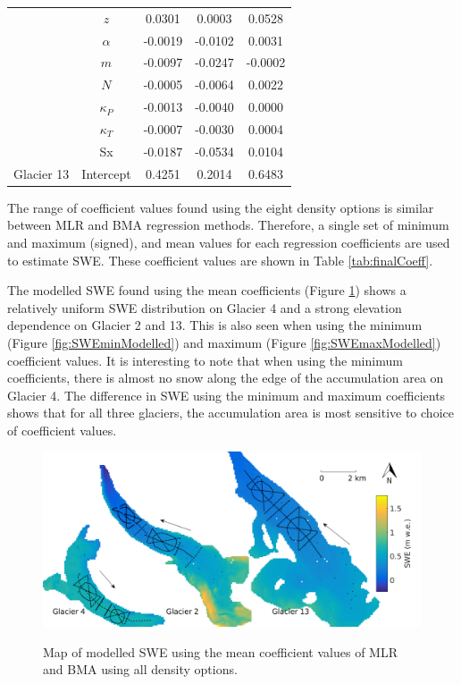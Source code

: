 \documentclass[12pt]{article}
\begin{document}
\begin{table}
\begin{tabular}{ccccc}
 & $z$ & 0.0301 & 0.0003 & 0.0528 \\
 
 & $\alpha$ & -0.0019 & -0.0102 & 0.0031 \\
 
 & $m$ & -0.0097 & -0.0247 & -0.0002 \\
 
 & $N$ & -0.0005 & -0.0064 & 0.0022 \\
 
 & $\kappa_P$ & -0.0013 & -0.0040 & 0.0000 \\
 
 & $\kappa_T$ & -0.0007 & -0.0030 & 0.0004 \\
 
 & Sx & -0.0187 & -0.0534 & 0.0104 \\
 
\multirow{-9}{*}{Glacier 13} & Intercept & 0.4251 & 0.2014 & 0.6483
\end{tabular}
\end{table}	

The range of coefficient values found using the eight density options is similar between MLR and BMA regression methods. Therefore, a single set of minimum and maximum (signed), and mean values for each regression coefficients are used to estimate SWE. These coefficient values are shown in Table \ref{tab:finalCoeff}. 

The modelled SWE found using the mean coefficients (Figure \ref{fig:SWEmeanModelled}) shows a relatively uniform SWE distribution on Glacier 4 and a strong elevation dependence on Glacier 2 and 13. This is also seen when using the minimum (Figure \ref{fig:SWEminModelled}) and maximum (Figure \ref{fig:SWEmaxModelled}) coefficient values. It is interesting to note that when using the minimum coefficients, there is almost no snow along the edge of the accumulation area on Glacier 4. The difference in SWE using the minimum and maximum coefficients shows that for all three glaciers, the accumulation area is most sensitive to choice of coefficient values. 

\begin{figure}[H]
	\centering
	\includegraphics[width =\textwidth]{SWEmeanModelled.png}\\
	\caption{Map of modelled SWE using the mean coefficient values of MLR and BMA using all density options.}
	\label{fig:SWEmeanModelled}
\end{figure}
	
\end{document}
